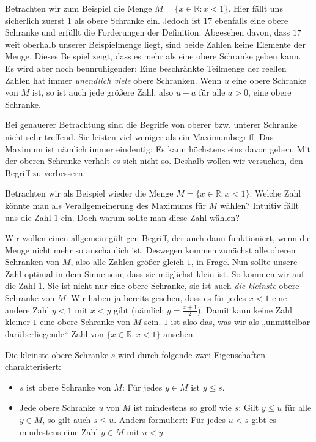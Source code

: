 \documentclass[fontsize=9pt,
               parskip=half-,
               DIV=14,
               listof=chapterentry,
               tocflat]{scrbook}
\begin{document}
Betrachten wir zum Beispiel die Menge $M=\{x\in \mathbb {R} :x<1\}$. Hier fällt uns sicherlich zuerst $1$ als obere Schranke ein. Jedoch ist $17$ ebenfalls eine obere Schranke und erfüllt die Forderungen der Definition. Abgesehen davon, dass $17$ weit oberhalb unserer Beispielmenge liegt, sind beide Zahlen keine Elemente der Menge. Dieses Beispiel zeigt, dass es mehr als eine obere Schranke geben kann. Es wird aber noch beunruhigender: Eine beschränkte Teilmenge der reellen Zahlen hat immer \emph{unendlich viele} obere Schranken. Wenn $u$ eine obere Schranke von $M$ ist, so ist auch jede größere Zahl, also $u+a$ für alle $a>0$, eine obere Schranke.

Bei genauerer Betrachtung sind die Begriffe von oberer bzw. unterer Schranke nicht sehr treffend. Sie leisten viel weniger als ein Maximumbegriff. Das Maximum ist nämlich immer eindeutig: Es kann höchstens eins davon geben. Mit der oberen Schranke verhält es sich nicht so. Deshalb wollen wir versuchen, den Begriff zu verbessern.

Betrachten wir als Beispiel wieder die Menge $M=\{x\in \mathbb {R} :x<1\}$. Welche Zahl könnte man als Verallgemeinerung des Maximums für $M$ wählen? Intuitiv fällt uns die Zahl $1$ ein. Doch warum sollte man diese Zahl wählen?

Wir wollen einen allgemein gültigen Begriff, der auch dann funktioniert, wenn die Menge nicht mehr so anschaulich ist. Deswegen kommen zunächst alle oberen Schranken von $M$, also alle Zahlen größer gleich $1$, in Frage. Nun sollte unsere Zahl optimal in dem Sinne sein, dass sie möglichst klein ist. So kommen wir auf die Zahl $1$. Sie ist nicht nur eine obere Schranke, sie ist auch \emph{die kleinste} obere Schranke von $M$. Wir haben ja bereits gesehen, dass es für jedes $x<1$ eine andere Zahl $y<1$ mit $x<y$ gibt (nämlich $y={\tfrac {x+1}{2}}$). Damit kann keine Zahl kleiner $1$ eine obere Schranke von $M$ sein. $1$ ist also das, was wir als „unmittelbar darüberliegende“ Zahl von $\{x\in \mathbb {R} :x<1\}$ ansehen.

Die kleinste obere Schranke $s$ wird durch folgende zwei Eigenschaften charakterisiert:

\begin{itemize}
\item $s$ ist obere Schranke von $M$: Für jedes $y\in M$ ist $y\leq s$.
\item Jede obere Schranke $u$ von $M$ ist mindestens so groß wie $s$: Gilt $y\leq u$ für alle $y\in M$, so gilt auch $s\leq u$. Anders formuliert: Für jedes $u<s$ gibt es mindestens eine Zahl $y\in M$ mit $u<y$.
\end{itemize}
\end{document}
